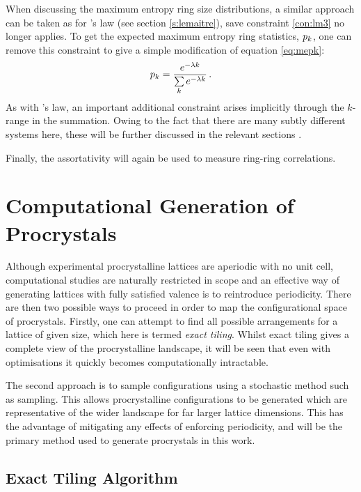 When discussing the maximum entropy ring size distributions, a similar approach can be taken as for \lm's law (see section \ref{s:lemaitre}), save constraint \eqref{con:lm3} no longer applies.
To get the expected maximum entropy ring statistics, $p_k$, one can remove this constraint to give a simple modification of equation \eqref{eq:mepk}:
\begin{equation}
	\label{eq:prome}
    p_k = \frac{e^{-\lambda k}}{\sum\limits_k e^{-\lambda k}}\,.
\end{equation}
As with \lm's law, an important additional constraint arises implicitly through the $k$\--range in the summation.
Owing to the fact that there are many subtly different systems here, these will be further discussed in the relevant sections .

Finally, the assortativity will again be used to measure ring\--ring correlations. 

\section{Computational Generation of Procrystals}

Although experimental procrystalline lattices are aperiodic with no unit cell, computational studies are naturally restricted in scope and an effective way of generating lattices with fully satisfied valence is to reintroduce periodicity. 
There are then two possible ways to proceed in order to map the configurational space of procrystals.
Firstly, one can attempt to find all possible arrangements for a lattice of given size, which here is termed \textit{exact tiling}.
Whilst exact tiling gives a complete view of the procrystalline landscape, it will be seen that even with optimisations it quickly becomes computationally intractable.

The second approach is to sample configurations using a stochastic method such as \mc{} sampling.
This allows procrystalline configurations to be generated which are representative of the wider landscape for far larger lattice dimensions.
This has the advantage of mitigating any effects of enforcing periodicity, and will be the primary method used to generate procrystals in this work.

\subsection{Exact Tiling Algorithm}


